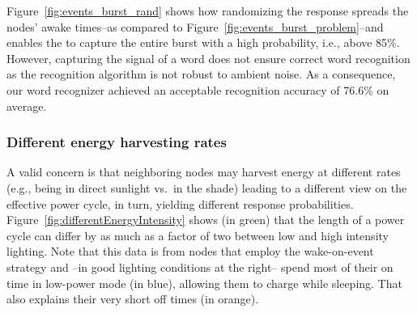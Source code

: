 Figure~\ref{fig:events_burst_rand} shows how randomizing the \cis response spreads the nodes' awake times--as compared to Figure~\ref{fig:events_burst_problem}--and enables the \cis to capture the entire burst with a high probability, i.e., above 85\%. 
However, capturing the signal of a word does not ensure correct word
recognition as the recognition algorithm is not robust to ambient noise.
As a consequence, our word recognizer achieved an acceptable recognition
accuracy of 76.6\% on average.
%
%
%
%
%
\subsubsection{Different energy harvesting rates}
\label{sec:diffEneHar}
A valid concern is that neighboring nodes may harvest energy at different
rates (e.g., being in direct sunlight vs.\ in the shade) leading to a different
view on the effective power cycle, in turn, yielding different response
probabilities. Figure~\ref{fig:differentEnergyIntensity} shows (in green)
that the length of a power cycle can differ by as much as a factor of two
between low and high intensity lighting. Note that this data is from nodes that
employ the wake-on-event strategy and --in good lighting conditions at the
right-- spend most of their on time in low-power mode (in blue), allowing
them to charge while sleeping. That also explains their very short off times
(in orange).

